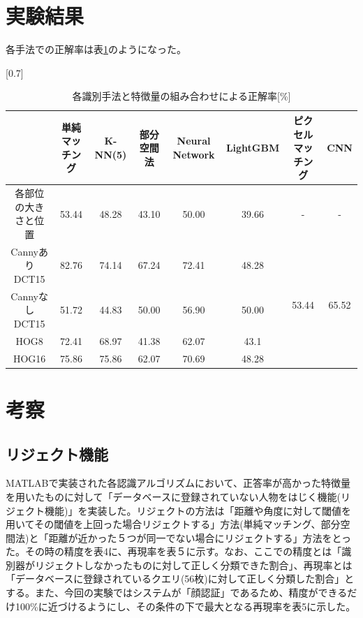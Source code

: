 \documentclass[10.5pt,a4j]{jarticle}
\begin{document}
	\section{実験結果}
	各手法での正解率は表\ref{result}のようになった。
	\begin{table}[H]
		\begin{center}
			\caption{各識別手法と特徴量の組み合わせによる正解率[\%]}
			\label{result}
			\scalebox{0.7}[0.7]{
			\begin{tabular}{|c|c|c|c|c|c|c|c|}\hline
									& 単純マッチング	& K-NN(5)	& 部分空間法	& Neural Network	& LightGBM	& ピクセルマッチング			& CNN   \\ \hline \hline
				各部位の大きさと位置	& 53.44			& 48.28		& 43.10		& 50.00				& 39.66		& -							& -		\\ \hline
				CannyありDCT15		& 82.76			& 74.14		& 67.24		& 72.41				& 48.28		& \multirow{4}{*}{53.44}	& \multirow{4}{*}{65.52}		\\ \cline{1-6}
				CannyなしDCT15		& 51.72			& 44.83		& 50.00		& 56.90				& 50.00		&							&		\\ \cline{1-6}
				HOG8				& 72.41			& 68.97		& 41.38		& 62.07				& 43.1		&							&		\\ \cline{1-6}
				HOG16				& 75.86			& 75.86		& 62.07		& 70.69				& 48.28		&							&		\\ \hline
		    \end{tabular}
		    }
		\end{center}
	\end{table}

	\section{考察}
	\subsection{リジェクト機能}
	MATLABで実装された各認識アルゴリズムにおいて、正答率が高かった特徴量を用いたものに対して「データベースに登録されていない人物をはじく機能(リジェクト機能)」を実装した。リジェクトの方法は「距離や角度に対して閾値を用いてその閾値を上回った場合リジェクトする」方法(単純マッチング、部分空間法)と「距離が近かった５つが同一でない場合にリジェクトする」方法をとった。その時の精度を表4に、再現率を表５に示す。なお、ここでの精度とは「識別器がリジェクトしなかったものに対して正しく分類できた割合」、再現率とは「データベースに登録されているクエリ(56枚)に対して正しく分類した割合」とする。また、今回の実験ではシステムが「顔認証」であるため、精度ができるだけ100\%に近づけるようにし、その条件の下で最大となる再現率を表5に示した。
\end{document}
